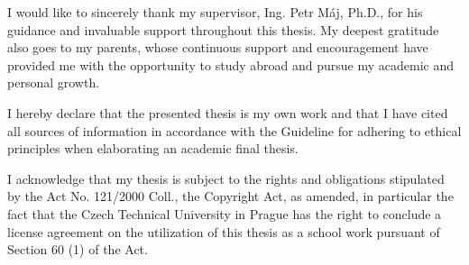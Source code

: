 \documentclass[english,bachelor,unicode,oneside]{ctufit-thesis}
\begin{document}
\frontmatter\frontmatterinit %

\thispagestyle{empty}\maketitle\thispagestyle{empty}\cleardoublepage %


\imprintpage %
\stopTOCentries

\begin{acknowledgmentpage}
    I would like to sincerely thank my supervisor, Ing. Petr Máj, Ph.D., for his guidance and invaluable support throughout this thesis. My deepest gratitude also goes to my parents, whose continuous support and encouragement have provided me with the opportunity to study abroad and pursue my academic and personal growth.
\end{acknowledgmentpage}


\begin{declarationpage}
I hereby declare that the presented thesis is my own work and that I have cited all sources of
information in accordance with the Guideline for adhering to ethical principles when elaborating an
academic final thesis.

I acknowledge that my thesis is subject to the rights and obligations stipulated by the Act No.
121/2000 Coll., the Copyright Act, as amended, in particular the fact that the Czech Technical
University in Prague has the right to conclude a license agreement on the utilization of this thesis as
a school work pursuant of Section 60 (1) of the Act.
\end{declarationpage}

\printabstractpage %
\end{document}

